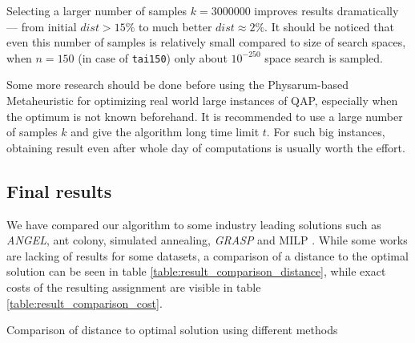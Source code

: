 Selecting a larger number of samples $k=3000000$ improves results dramatically --- from initial $dist>15\%$ to much better $dist{\approx}2\%$. It should be noticed that even this number of samples is relatively small compared to size of search spaces, when $n=150$ (in case of \texttt{tai150}) only about $10^{-250}$ space search is sampled.

Some more research should be done before using the Physarum-based Metaheuristic for optimizing real world large instances of QAP, especially when the optimum is not known beforehand. It is recommended to use a large number of samples $k$ and give the algorithm long time limit $t$. For such big instances, obtaining result even after whole day of computations is usually worth the effort.

\subsection{Final results}

We have compared our algorithm to some industry leading solutions such as \textit{ANGEL}, ant colony, simulated annealing, \textit{GRASP} and MILP \cite{TODO}. While some works are lacking of results for some datasets, a comparison of a distance to the optimal solution can be seen in table \ref{table:result_comparison_distance}, while exact costs of the resulting assignment are visible in table \ref{table:result_comparison_cost}. 

\begin{table}
  \centering
  \caption{Comparison of distance to optimal solution using different methods \cite{TODO}}
  \label{table:result_comparison_distance}

\end{table}

